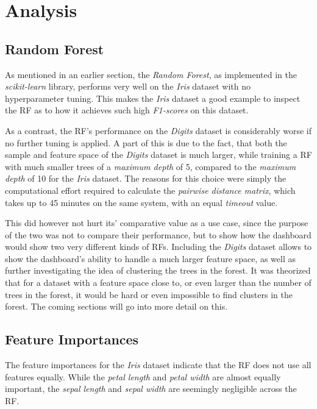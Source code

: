 \documentclass[a4paper, 12pt]{article}
\begin{document}
\section{Analysis}
\subsection{Random Forest}
As mentioned in an earlier section, the \textit{Random Forest}, as implemented in the
\textit{scikit-learn} library, performs very well on the \textit{Iris} dataset with no hyperparameter
tuning. This makes the \textit{Iris} dataset a good example to inspect the RF as to how it achieves
such high \textit{F1-scores} on this dataset. \par
As a contrast, the RF's performance on the \textit{Digits} dataset is considerably worse if no further
tuning is applied. A part of this is due to the fact, that both the sample and feature space of the
\textit{Digits} dataset is much larger, while training a RF with much smaller trees of a
\textit{maximum depth} of 5, compared to the \textit{maximum depth} of 10 for the \textit{Iris} dataset.
The reasons for this choice were simply the computational effort required to calculate the
\textit{pairwise distance matrix}, which takes up to 45 minutes on the same system, with an equal
\textit{timeout} value. \par
This did however not hurt its' comparative value as a use case, since the purpose of the two was not to
compare their performance, but to show how the dashboard would show two very different kinds of RFs.
Including the \textit{Digits} dataset allows to show the dashboard's ability to handle a much larger
feature space, as well as further investigating the idea of clustering the trees in the forest.
It was theorized that for a dataset with a feature space close to, or even larger than the number of
trees in the forest, it would be hard or even impossible to find clusters in the forest. The coming
sections will go into more detail on this. \par

\subsection{Feature Importances}
The feature importances for the \textit{Iris} dataset indicate that the RF does not use all features
equally. While the \textit{petal length} and \textit{petal width} are almost equally important,
the \textit{sepal length} and \textit{sepal width} are seemingly negligible across the RF. \par
\end{document}
